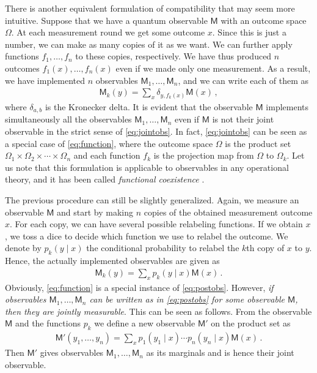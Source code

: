\documentclass[12pt]{article}
\theoremstyle{definition}
\newcommand{\Mo}{\mathsf{M}}%
\begin{document}
There is another equivalent formulation of compatibility that may seem more intuitive. 
Suppose that we have a quantum observable $\Mo$ with an outcome space $\Omega$.
At each measurement round we get some outcome $x$. 
Since this is just a number, we can make as many copies of it as we want. 
We can further apply functions $f_1,\ldots,f_n$ to these copies, respectively.
We have thus produced $n$ outcomes $f_1(x),\ldots,f_n(x)$ even if we made only one measurement.
As a result, we have implemented $n$ observables $\Mo_1,\ldots,\Mo_n$, and we can write each of them as
\begin{align}\label{eq:function}
 \Mo_k(y) = \sum_{x} \delta_{y,f_k(x)}\Mo(x) \, ,
\end{align}
where $\delta_{a,b}$ is the Kronecker delta.
It is evident that the observable $\Mo$ implements simultaneously all the observables $\Mo_1,\ldots,\Mo_n$ even if $\Mo$ is not their joint observable in the strict sense of \eqref{eq:jointobs}.
In fact, \eqref{eq:jointobs} can be seen as a special case of \eqref{eq:function}, where the outcome space $\Omega$ is the product set $\Omega_1\times\Omega_2\times\cdots\times\Omega_n$ and each function $f_k$ is the projection map from $\Omega$ to $\Omega_k$. 
Let us note that this formulation is applicable to observables in any operational theory, and it has been called \emph{functional coexistence} \cite{LaPuYl98}.

The previous procedure can still be slightly generalized.
Again, we measure an observable $\Mo$ and start by making $n$ copies of the obtained measurement outcome $x$.
For each copy, we can have several possible relabeling functions.
If we obtain $x$, we toss a dice to decide which function we use to relabel the outcome.
We denote by $p_k(y\mid x)$ the conditional probability to relabel the $k$th copy of $x$ to $y$.
Hence, the actually implemented observables are given as
\begin{align}\label{eq:postobs}
\Mo_k(y) = \sum_{x} p_k(y \mid x) \Mo(x) \, .
\end{align}
Obviously, \eqref{eq:function} is a special instance of \eqref{eq:postobs}. However, \emph{if observables $\Mo_1, \ldots, \Mo_n$ can be written as in \eqref{eq:postobs} for some observable $\Mo$, then they are jointly measurable}. This can be seen as follows. 
From the observable $\Mo$ and the functions $p_k$ we define a new observable $\Mo'$ on the product set as
\begin{align}\label{eq:post->joint}
\Mo'(y_1,\ldots,y_n) =  \sum_x p_1(y_1 \mid x)\cdots p_n(y_n \mid x) \Mo(x) \, .
\end{align}
Then $\Mo'$ gives observables $\Mo_1, \ldots, \Mo_n$ as its marginals and is hence their joint observable.
\end{document}
